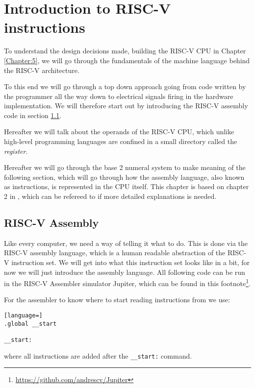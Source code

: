 \chapter{Introduction to RISC-V instructions}
    To understand the design decisions made, building the RISC-V CPU in Chapter \ref{Chapter:5}, we will go through the fundamentals of the machine language behind the RISC-V architecture. 
    
    To this end we will go through a top down approach going from code written by the programmer all the way down to electrical signals firing in the hardware implementation. We will therefore start out by introducing the RISC-V assembly code in section \ref{section:RISC-V Asembly}. 
    
    Hereafter we will talk about the operands of the RISC-V CPU, which unlike high-level programming languages are confined in a small directory called the \textit{register}. 
    
    Hereafter we will go through the base 2 numeral system to make meaning of the following section, which will go through how the assembly language, also known as instructions, is represented in the CPU itself. This chapter is based on chapter 2 in \cite{riscVbook}, which can be refereed to if more detailed explanations is needed.

\section{RISC-V Assembly}\label{section:RISC-V Asembly}
    Like every computer, we need a way of telling it what to do. This is done via the RISC-V assembly language, which is a human readable abstraction of the RISC-V instruction set. We will get into what this instruction set looks like in a bit, for now we will just introduce the assembly language. All following code can be run in the RISC-V Assembler simulator Jupiter, which can be found in this footnote\footnote{\url{https://github.com/andrescv/Jupiter}}.
    
    For the assembler to know where to start reading instructions from we use:
    
    \begin{lstlisting}[language=]
.global __start

__start:
    \end{lstlisting}
    where all instructions are added after the \texttt{\_\_start:} command.
    
